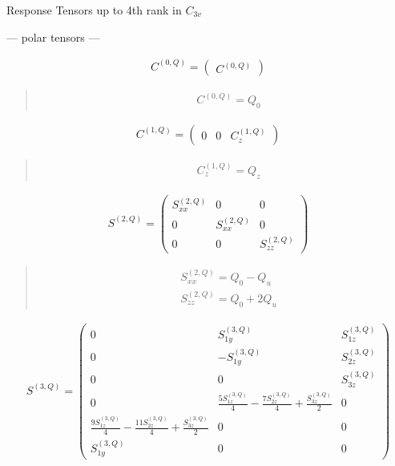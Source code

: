 \documentclass[fleqn,10pt]{jsarticle}
\begin{document}
\setcounter{MaxMatrixCols}{16}

\begin{center}
\LARGE
Response Tensors up to 4th rank in $C_{3v}$
\end{center}
\begin{center}\LARGE --- polar tensors ---\end{center}
\begin{align*}
C^{(0,Q)} = \begin{pmatrix} C^{(0,Q)} \end{pmatrix}
\end{align*}
\begin{quote}
\begin{align*}
& C^{(0,Q)} = Q_{0}
\end{align*}
\end{quote}
\begin{align*}
C^{(1,Q)} = \begin{pmatrix} 0 & 0 & C^{(1,Q)}_{z} \end{pmatrix}
\end{align*}
\begin{quote}
\begin{align*}
& C^{(1,Q)}_{z} = Q_{z}
\end{align*}
\end{quote}
\begin{align*}
S^{(2,Q)} = \begin{pmatrix} S^{(2,Q)}_{xx} & 0 & 0 \\ 0 & S^{(2,Q)}_{xx} & 0 \\ 0 & 0 & S^{(2,Q)}_{zz} \end{pmatrix}
\end{align*}
\begin{quote}
\begin{align*}
& S^{(2,Q)}_{xx} = Q_{0} - Q_{u} \\
& S^{(2,Q)}_{zz} = Q_{0} + 2 Q_{u}
\end{align*}
\end{quote}
\begin{align*}
S^{(3,Q)} = \begin{pmatrix} 0 & S^{(3,Q)}_{1y} & S^{(3,Q)}_{1z} \\ 0 & - S^{(3,Q)}_{1y} & S^{(3,Q)}_{2z} \\ 0 & 0 & S^{(3,Q)}_{3z} \\ 0 & \frac{5 S^{(3,Q)}_{1z}}{4} - \frac{7 S^{(3,Q)}_{2z}}{4} + \frac{S^{(3,Q)}_{3z}}{2} & 0 \\ \frac{9 S^{(3,Q)}_{1z}}{4} - \frac{11 S^{(3,Q)}_{2z}}{4} + \frac{S^{(3,Q)}_{3z}}{2} & 0 & 0 \\ S^{(3,Q)}_{1y} & 0 & 0 \end{pmatrix}
\end{align*}
\end{document}
